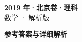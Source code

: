\documentclass[zihao=-4, a4paper]{ctexart}
\begin{document}
\begin{center}
  {\Large\bfseries 2019 年·北京卷·理科}\\[4pt]
  {\large 数学 · 解析版}
\end{center}
\medskip
{}

\clearpage
{}
\begin{center}{\Large\bfseries 参考答案与详细解析}\end{center}
\medskip

\end{document}
